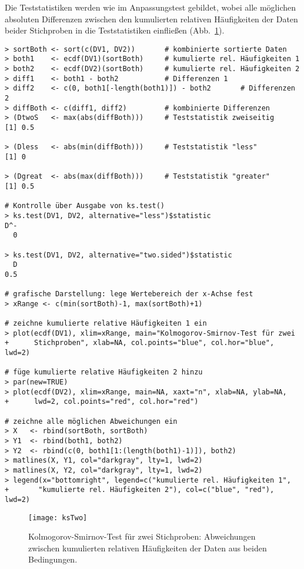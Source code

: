 Die Teststatistiken werden wie im Anpassungstest gebildet, wobei alle möglichen absoluten Differenzen zwischen den kumulierten relativen Häufigkeiten der Daten beider Stichproben in die Teststatistiken einfließen (Abb.\ \ref{fig:ksTwo}).
\begin{lstlisting}
> sortBoth <- sort(c(DV1, DV2))       # kombinierte sortierte Daten
> both1    <- ecdf(DV1)(sortBoth)     # kumulierte rel. Häufigkeiten 1
> both2    <- ecdf(DV2)(sortBoth)     # kumulierte rel. Häufigkeiten 2
> diff1    <- both1 - both2           # Differenzen 1
> diff2    <- c(0, both1[-length(both1)]) - both2       # Differenzen 2
> diffBoth <- c(diff1, diff2)         # kombinierte Differenzen
> (DtwoS   <- max(abs(diffBoth)))     # Teststatistik zweiseitig
[1] 0.5

> (Dless   <- abs(min(diffBoth)))     # Teststatistik "less"
[1] 0

> (Dgreat  <- abs(max(diffBoth)))     # Teststatistik "greater"
[1] 0.5

# Kontrolle über Ausgabe von ks.test()
> ks.test(DV1, DV2, alternative="less")$statistic
D^-
  0

> ks.test(DV1, DV2, alternative="two.sided")$statistic
  D
0.5

# grafische Darstellung: lege Wertebereich der x-Achse fest
> xRange <- c(min(sortBoth)-1, max(sortBoth)+1)

# zeichne kumulierte relative Häufigkeiten 1 ein
> plot(ecdf(DV1), xlim=xRange, main="Kolmogorov-Smirnov-Test für zwei
+      Stichproben", xlab=NA, col.points="blue", col.hor="blue", lwd=2)

# füge kumulierte relative Häufigkeiten 2 hinzu
> par(new=TRUE)
> plot(ecdf(DV2), xlim=xRange, main=NA, xaxt="n", xlab=NA, ylab=NA,
+      lwd=2, col.points="red", col.hor="red")

# zeichne alle möglichen Abweichungen ein
> X   <- rbind(sortBoth, sortBoth)
> Y1  <- rbind(both1, both2)
> Y2  <- rbind(c(0, both1[1:(length(both1)-1)]), both2)
> matlines(X, Y1, col="darkgray", lty=1, lwd=2)
> matlines(X, Y2, col="darkgray", lty=1, lwd=2)
> legend(x="bottomright", legend=c("kumulierte rel. Häufigkeiten 1",
+       "kumulierte rel. Häufigkeiten 2"), col=c("blue", "red"), lwd=2)
\end{lstlisting}

\begin{figure}[ht]
\centering
\texttt{[image: ksTwo]}
\vspace*{-1.5em}
\caption{Kolmogorov-Smirnov-Test für zwei Stichproben: Abweichungen zwischen kumulierten relativen Häufigkeiten der Daten aus beiden Bedingungen.}
\label{fig:ksTwo}
\end{figure}


